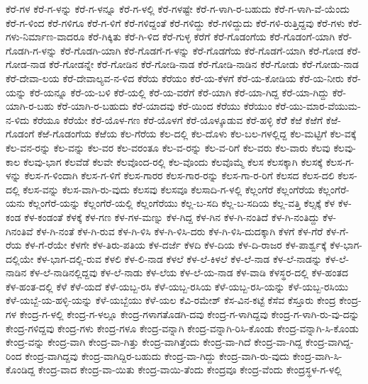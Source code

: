 ಕೆರೆ-ಗಳ
ಕೆರೆ-ಗ-ಳನ್ನು
ಕೆರೆ-ಗ-ಳನ್ನೂ
ಕೆರೆ-ಗ-ಳಲ್ಲಿ
ಕೆರೆ-ಗಳಷ್ಟೇ
ಕೆರೆ-ಗ-ಳಾಗಿ-ರ-ಬಹುದು
ಕೆರೆ-ಗ-ಳಾಗಿ-ವೆ-ಯೆಂದು
ಕೆರೆ-ಗ-ಳಿಂದ
ಕೆರೆ-ಗಳಿಗೂ
ಕೆರೆ-ಗ-ಳಿಗೆ
ಕೆರೆ-ಗಳಿದ್ದಂತೆ
ಕೆರೆ-ಗಳಿದ್ದು
ಕೆರೆ-ಗಳಿದ್ದುದು
ಕೆರೆ-ಗಳಿ-ರುತ್ತಿದ್ದವು
ಕೆರೆ-ಗಳು
ಕೆರೆ-ಗಳು-ನಿರ್ಮಾಣ-ವಾದರೂ
ಕೆರೆ-ಗಿಕ್ಕಿತು
ಕೆರೆ-ಗಿ-ಳಿದ
ಕೆರೆ-ಗುಳ್ಳ
ಕೆರೆಗೆ
ಕೆರೆ-ಗೊಡಂಗೆಯ
ಕೆರೆ-ಗೊಡಂಗೆ-ಯಾಗಿ
ಕೆರೆ-ಗೊಡಗಿ-ಗ-ಳನ್ನು
ಕೆರೆ-ಗೊಡಗಿ-ಯಾಗಿ
ಕೆರೆ-ಗೊಡಗೆ-ಗ-ಳನ್ನು
ಕೆರೆ-ಗೊಡಗೆಯ
ಕೆರೆ-ಗೊಡಗೆ-ಯಾಗಿ
ಕೆರೆ-ಗೋಡ
ಕೆರೆ-ಗೋಡ-ನಾಡ
ಕೆರೆ-ಗೋಡನ್ನೇ
ಕೆರೆ-ಗೋಡಿನ
ಕೆರೆ-ಗೋಡಿ-ನಾಡ
ಕೆರೆ-ಗೋಡಿ-ನಾಡಿನ
ಕೆರೆ-ಗೋಡು
ಕೆರೆ-ಗೋಡು-ನಾಡ
ಕೆರೆ-ದೇವಾ-ಲಯ
ಕೆರೆ-ದೇವಾಲ್ಯವ-ನ-ಳಿದ
ಕೆರೆಯ
ಕೆರೆಯಂ
ಕೆರೆ-ಯ-ಕೆಳಗೆ
ಕೆರೆ-ಯ-ಕೋಡಿಯ
ಕೆರೆ-ಯ-ನೀರು
ಕೆರೆ-ಯನ್ನು
ಕೆರೆ-ಯನ್ನೂ
ಕೆರೆ-ಯ-ಬಳಿ
ಕೆರೆ-ಯಲ್ಲಿ
ಕೆರೆ-ಯ-ವರೆಗೆ
ಕೆರೆ-ಯಾಗಿ
ಕೆರೆ-ಯಾ-ಗಿದ್ದ
ಕೆರೆ-ಯಾ-ಗಿದ್ದು
ಕೆರೆ-ಯಾಗಿ-ರ-ಬಹು
ಕೆರೆ-ಯಾಗಿ-ರ-ಬಹುದು
ಕೆರೆ-ಯಾದವು
ಕೆರೆ-ಯಿಂದ
ಕೆರೆಯು
ಕೆರೆಯುಂ
ಕೆರೆ-ಯು-ಮಾರ-ವೆಯುಮ-ನ-ಳಿದು
ಕೆರೆಯೂ
ಕೆರೆಯೇ
ಕೆರೆ-ಯೊಳ-ಗಣ
ಕೆರೆ-ಯೊಳಗೆ
ಕೆರೆ-ಯೊಳ್ಕೂಡುವ
ಕೆರೆ-ಹಳ್ಳಿ
ಕೆರೆೆ
ಕೆಱೆ
ಕೆಱೆಗೆ
ಕೆಱೆ-ಗೊಡಂಗೆ
ಕೆಱೆ-ಗೊಡಂಗೆಯ
ಕೆಱೆಯ
ಕೆಲ-ಗೆರೆಯ
ಕೆಲ-ದಲ್ಲಿ
ಕೆಲ-ದೊಳು
ಕೆಲ-ಬಲ-ಗಳಲ್ಲಿದ್ದ
ಕೆಲ-ಮಟ್ಟಿಗೆ
ಕೆಲ-ವಕ್ಕೆ
ಕೆಲ-ವನ-ರನ್ನು
ಕೆಲ-ವನ್ನು
ಕೆಲ-ವರ
ಕೆಲ-ವರಂತೂ
ಕೆಲ-ವ-ರನ್ನು
ಕೆಲ-ವ-ರಿಗೆ
ಕೆಲ-ವರು
ಕೆಲ-ವಾರು
ಕೆಲವು
ಕೆಲವು-ಕಾಲ
ಕೆಲವು-ಭಾಗ
ಕೆಲವೆಡೆ
ಕೆಲವೇ
ಕೆಲವೊಂದ-ರಲ್ಲಿ
ಕೆಲ-ವೊಂದು
ಕೆಲವೊಮ್ಮೆ
ಕೆಲಸ
ಕೆಲಸಕ್ಕಾಗಿ
ಕೆಲಸಕ್ಕೆ
ಕೆಲಸ-ಗ-ಳನ್ನು
ಕೆಲಸ-ಗ-ಳಿಂದಾಗಿ
ಕೆಲಸ-ಗ-ಳಿಗೆ
ಕೆಲಸ-ಗಾರರ
ಕೆಲಸ-ಗಾರ-ರನ್ನು
ಕೆಲಸ-ಗಾ-ರ-ರಿಗೆ
ಕೆಲಸದ
ಕೆಲಸ-ದಲಿ
ಕೆಲಸ-ದಲ್ಲಿ
ಕೆಲಸ-ವನ್ನು
ಕೆಲಸ-ವಾಗಿ-ರು-ವುದು
ಕೆಲಸವು
ಕೆಲಸವೂ
ಕೆಲಸಾದಿ-ಗ-ಳಲ್ಲಿ
ಕೆಲ್ಲಂಗೆರೆ
ಕೆಲ್ಲಂಗೆರೆಯ
ಕೆಲ್ಲಂಗೆರೆ-ಯನು
ಕೆಲ್ಲಂಗೆರೆ-ಯನ್ನು
ಕೆಲ್ಲಂಗೆರೆ-ಯಲ್ಲಿ
ಕೆಲ್ಲಂಗೆರೆಯು
ಕೆಲ್ಲ-ಬ-ಸದಿ
ಕೆಲ್ಲ-ಬ-ಸದಿಯ
ಕೆಲ್ಲ-ವತ್ತಿ
ಕೆಲ್ಸಕ್ಕೆ
ಕೆಳ
ಕೆಳ-ಕಂಡ
ಕೆಳ-ಕಂಡಂತೆ
ಕೆಳಕ್ಕೆ
ಕೆಳ-ಗಣ
ಕೆಳ-ಗಳ-ಮಣ್ನು
ಕೆಳ-ಗಿದ್ದ
ಕೆಳ-ಗಿನ
ಕೆಳ-ಗಿ-ನಂತಿದೆ
ಕೆಳ-ಗಿ-ನಂತಿದ್ದು
ಕೆಳ-ಗಿನಂತಿವೆ
ಕೆಳ-ಗಿ-ನಂತೆ
ಕೆಳ-ಗಿ-ರುವ
ಕೆಳ-ಗಿ-ಳಿಸಿ
ಕೆಳ-ಗಿ-ಳಿಸಿ-ದರು
ಕೆಳ-ಗಿ-ಳಿಸಿ-ದುದಕ್ಕಾಗಿ
ಕೆಳಗೆ
ಕೆಳ-ಗೆರೆ
ಕೆಳ-ಗೆ-ರೆಯ
ಕೆಳ-ಗೆ-ರೆಯೇ
ಕೆಳಗೇ
ಕೆಳ-ತಿರು-ಪತಿಯ
ಕೆಳ-ದರ್ಜೆ
ಕೆಳದಿ
ಕೆಳ-ದಿಯ
ಕೆಳ-ದಿ-ರಾಜರ
ಕೆಳ-ಪಾರ್ಶ್ವಕ್ಕೆ
ಕೆಳ-ಭಾಗ-ದಲ್ಲಿಯೇ
ಕೆಳ-ಭಾಗ-ದಲ್ಲಿ-ರುವ
ಕೆಳಲಿ
ಕೆಳ-ಲಿ-ನಾಡ
ಕೆಳಲೆ
ಕೆಳ-ಲೆ-ಕಿಳಲೆ
ಕೆಳ-ಲೆ-ನಾಡ
ಕೆಳ-ಲೆ-ನಾಡನ್ನು
ಕೆಳ-ಲೆ-ನಾಡಿನ
ಕೆಳ-ಲೆ-ನಾಡಿನಲ್ಲಿದ್ದವು
ಕೆಳ-ಲೆ-ನಾಡು
ಕೆಳ-ಲೆಯ
ಕೆಳ-ಲೆ-ಯ-ನಾಡ
ಕೆಳ-ವಾಡಿ
ಕೆಳಸ್ಥರ-ದಲ್ಲಿ
ಕೆಳ-ಹಂತದ
ಕೆಳ-ಹಂತ-ದಲ್ಲಿ
ಕೆಳೆ
ಕೆಳೆ-ಯದೆ
ಕೆಳೆ-ಯಬ್ಬ-ರಸಿ
ಕೆಳೆ-ಯಬ್ಬ-ರಸಿಯ
ಕೆಳೆ-ಯಬ್ಬ-ರಸಿ-ಯನ್ನು
ಕೆಳೆ-ಯಬ್ಬ-ರಸಿಯು
ಕೆಳೆ-ಯಬ್ಬೆ-ಯ-ಹಳ್ಳಿ-ಯನ್ನು
ಕೆಳೆ-ಯಬ್ಬೆಯು
ಕೆಳೆ-ಯಲ
ಕೆವಿ-ರಮೇಶ್
ಕೆಸ-ವಿನ-ಕಟ್ಟೆ
ಕೆಸೆವ
ಕೆಸ್ತೂರು
ಕೇಂದ್ರ
ಕೇಂದ್ರ-ಗಳ
ಕೇಂದ್ರ-ಗ-ಳಲ್ಲಿ
ಕೇಂದ್ರ-ಗ-ಳಲ್ಲೂ
ಕೇಂದ್ರ-ಗಳಾಗತೊಡಗಿ-ದವು
ಕೇಂದ್ರ-ಗ-ಳಾಗಿದ್ದವು
ಕೇಂದ್ರ-ಗ-ಳಾಗಿ-ರು-ವು-ದನ್ನು
ಕೇಂದ್ರ-ಗಳಿದ್ದವು
ಕೇಂದ್ರ-ಗಳು
ಕೇಂದ್ರ-ಗಳೂ
ಕೇಂದ್ರ-ವನ್ನಾಗಿ
ಕೇಂದ್ರ-ವನ್ನಾಗಿ-ರಿಸಿ-ಕೊಂಡು
ಕೇಂದ್ರ-ವನ್ನಾಗಿ-ಸಿ-ಕೊಂಡು
ಕೇಂದ್ರ-ವನ್ನು
ಕೇಂದ್ರ-ವಾಗಿ
ಕೇಂದ್ರ-ವಾ-ಗಿತ್ತು
ಕೇಂದ್ರ-ವಾಗಿತ್ತೆಂದು
ಕೇಂದ್ರ-ವಾ-ಗಿದೆ
ಕೇಂದ್ರ-ವಾ-ಗಿದ್ದ
ಕೇಂದ್ರ-ವಾಗಿದ್ದ-ರಿಂದ
ಕೇಂದ್ರ-ವಾಗಿದ್ದವು
ಕೇಂದ್ರ-ವಾಗಿದ್ದಿರ-ಬಹುದು
ಕೇಂದ್ರ-ವಾ-ಗಿದ್ದು
ಕೇಂದ್ರ-ವಾಗಿ-ರು-ವುದು
ಕೇಂದ್ರ-ವಾಗಿ-ಸಿ-ಕೊಂಡಿದ್ದ
ಕೇಂದ್ರ-ವಾದ
ಕೇಂದ್ರ-ವಾ-ಯಿತು
ಕೇಂದ್ರ-ವಾಯಿ-ತೆಂದು
ಕೇಂದ್ರವೂ
ಕೇಂದ್ರ-ವೆಂದು
ಕೇಂದ್ರಸ್ಥಳ-ಗ-ಳಲ್ಲಿ
